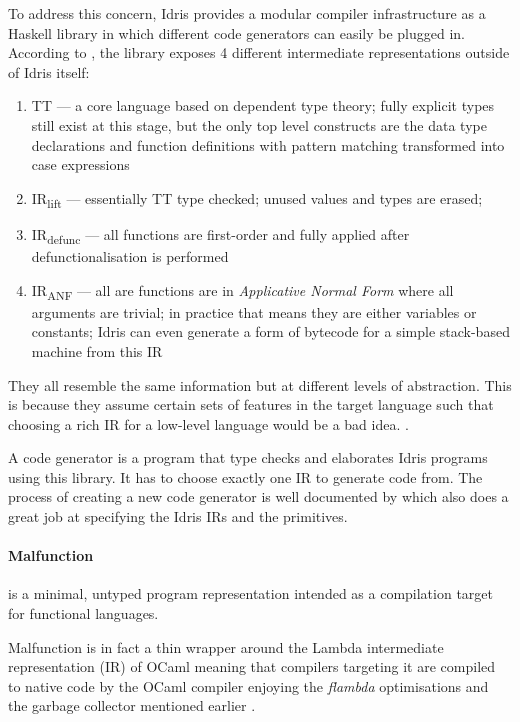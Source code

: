 \documentclass[a4paper,11pt,twocolumn]{article}
\begin{document}
To address this concern, Idris provides a modular compiler
infrastructure as a Haskell library in which different code
generators can easily be plugged in.
According to \cite{crosscompilers},
the library exposes 4 different intermediate representations outside
of Idris itself:
\begin{enumerate}
    \item TT --- a core language based on dependent type theory; fully
          explicit types still exist at this stage, but the only top level
          constructs are the data type declarations and function definitions
          with pattern matching transformed into case expressions
    \item IR\textsubscript{lift} --- essentially TT type checked; unused values
          and types are erased;
    \item IR\textsubscript{defunc} --- all functions are first-order
          and fully applied after defunctionalisation is performed
    \item IR\textsubscript{ANF} --- all are functions are in
          \emph{Applicative Normal Form} where all arguments are trivial;
          in practice that means they are either variables or constants;
          Idris can even generate a form of bytecode for a simple
          stack-based machine from this IR
\end{enumerate}
They all resemble the same information but at different levels
of abstraction. This is because they assume certain sets of features
in the target language such that choosing a rich IR
for a low-level language would be a bad idea.
\cite{ElliottIdrisErlang}.


A code generator is a program that type checks and elaborates
Idris programs using this library.
It has to choose exactly one
IR to generate code from.
The process of creating a new code generator is well
documented by \cite{ElliottIdrisErlang} which also does a great job
at specifying the Idris IRs and the primitives.


\paragraph{Malfunction}
is a minimal, untyped program representation intended as a
compilation target for functional languages.

Malfunction is in fact a thin wrapper around the Lambda intermediate
representation (IR) of OCaml meaning that compilers targeting it
are compiled to native code by the OCaml compiler enjoying the
\emph{flambda} optimisations and the garbage collector mentioned
earlier \cite{dolan2016malfunctional}.
\end{document}
